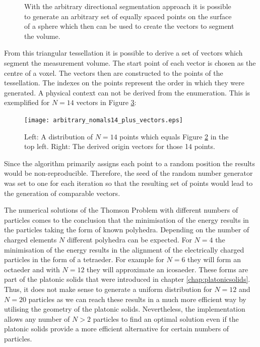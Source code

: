 \begin{figure}[H]
\begin{subfigure}[b]{0.48\textwidth}
         \label{fig:arbitary_n200}
     \end{subfigure} 
        \caption{With the arbitrary directional segmentation approach it is possible to generate an arbitrary set of equally spaced points on the surface of a sphere which then can be used to create the vectors to segment the volume. }
        \label{fig:arbitrary_example}
\end{figure}

From this triangular tessellation it is possible to derive a set of vectors which segment the measurement volume. The start point of each vector is chosen as the centre of a voxel. The vectors then are constructed to the points of the tessellation. The indexes on the points represent the order in which they were generated. A physical context can not be derived from the enumeration.  This is exemplified for $N = 14$ vectors in Figure \ref{vectors_from_points}:

\begin{figure}[H]
    \texttt{[image: arbitrary\_nomals14\_plus\_vectors.eps]}
    \caption{Left: A distribution of $N = 14$ points which equals Figure \ref{fig:arbitrary_example} in the top left. Right: The derived origin vectors for those 14 points.}
    \label{vectors_from_points}
\end{figure}


Since the algorithm primarily assigns each point to a random position the results would be non-reproducible. Therefore, the seed of the random number generator was set to one for each iteration so that the resulting set of points would lead to the generation of comparable vectors. 

The numerical solutions of the Thomson Problem with different numbers of particles comes to the conclusion that the minimisation of the energy results in the particles taking the form of known polyhedra. Depending on the number of charged elements $N$ different polyhedra can be expected. For $N = 4$ the minimisation of the energy results in the alignment of the electrically charged particles in the form of a tetraeder. For example for $N = 6$ they will form an octaeder and with $N = 12$ they will approximate an icosaeder. These forms are part of the platonic solids that were introduced in chapter \ref{chap:platonicsolids}. Thus, it does not make sense to generate a uniform distribution for $N = 12$ and $N = 20$ particles as we can reach these results in a much more efficient way by utilising the geometry of the platonic solids. Nevertheless, the implementation allows any number of $N > 2$ particles to find an optimal solution even if the platonic solids provide a more efficient alternative for certain numbers of particles.


